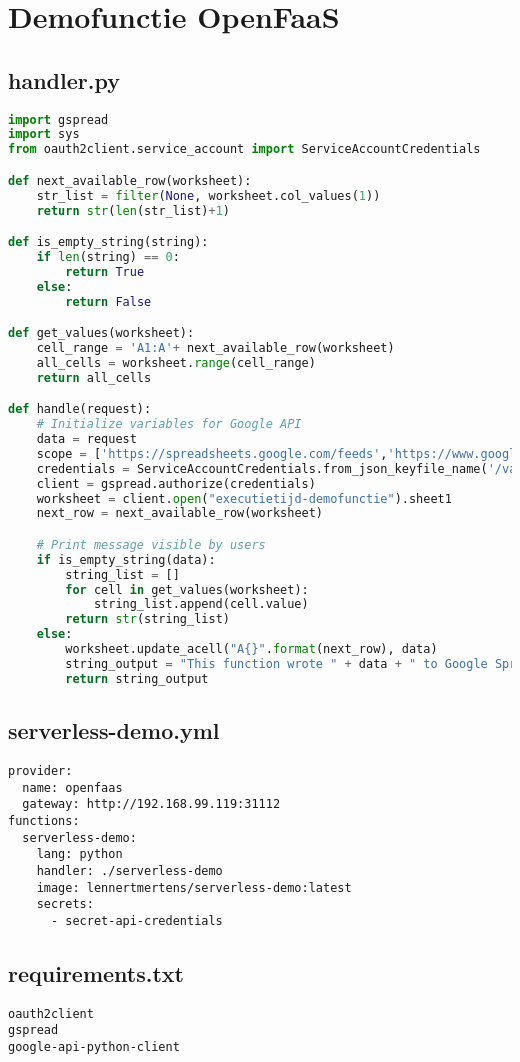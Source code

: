 \newpage
\section{Demofunctie OpenFaaS}
\subsection{handler.py}
\label{sec:demofunctie-openfaas}
\begin{lstlisting}[language=python]
import gspread
import sys
from oauth2client.service_account import ServiceAccountCredentials

def next_available_row(worksheet):
    str_list = filter(None, worksheet.col_values(1))
    return str(len(str_list)+1)

def is_empty_string(string):
    if len(string) == 0:
        return True
    else:
        return False

def get_values(worksheet):
    cell_range = 'A1:A'+ next_available_row(worksheet)
    all_cells = worksheet.range(cell_range)
    return all_cells

def handle(request):   
    # Initialize variables for Google API
    data = request
    scope = ['https://spreadsheets.google.com/feeds','https://www.googleapis.com/auth/drive']
    credentials = ServiceAccountCredentials.from_json_keyfile_name('/var/openfaas/secrets/secret-api-credentials', scope)
    client = gspread.authorize(credentials)
    worksheet = client.open("executietijd-demofunctie").sheet1
    next_row = next_available_row(worksheet)

    # Print message visible by users
    if is_empty_string(data):
        string_list = []
        for cell in get_values(worksheet):
            string_list.append(cell.value)
        return str(string_list)
    else:
        worksheet.update_acell("A{}".format(next_row), data)
        string_output = "This function wrote " + data + " to Google Spreadsheets!"
        return string_output
\end{lstlisting}

\newpage
\subsection{serverless-demo.yml}
\label{sec:serverless-demo.yml}
\begin{lstlisting}
provider:
  name: openfaas
  gateway: http://192.168.99.119:31112
functions:
  serverless-demo:
    lang: python
    handler: ./serverless-demo
    image: lennertmertens/serverless-demo:latest
    secrets:
      - secret-api-credentials
\end{lstlisting}

\subsection{requirements.txt}
\label{sec:requirements.txt}
\begin{lstlisting}
oauth2client
gspread
google-api-python-client
\end{lstlisting}